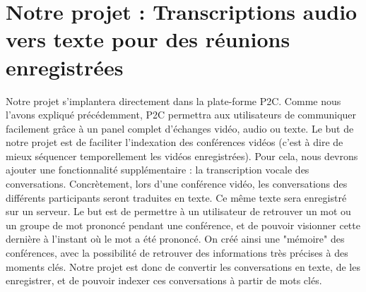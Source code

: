 	\section{Notre projet : Transcriptions audio vers texte pour des réunions enregistrées}
	Notre projet s'implantera directement dans la plate-forme P2C. Comme nous l'avons expliqué précédemment, P2C permettra aux utilisateurs de communiquer facilement grâce à un panel complet d'échanges vidéo, audio ou texte. Le but de notre projet est de faciliter l'indexation des conférences vidéos (c'est à dire de mieux séquencer temporellement les vidéos enregistrées). Pour cela, nous devrons ajouter une fonctionnalité supplémentaire : la transcription vocale des conversations. Concrètement, lors d'une conférence vidéo, les conversations des différents participants seront traduites en texte. Ce même texte sera enregistré sur un serveur. Le but est de permettre à un utilisateur de retrouver un mot ou un groupe de mot prononcé pendant une conférence, et de pouvoir visionner cette dernière à l'instant où le mot a été prononcé. On créé ainsi une "mémoire" des conférences, avec la possibilité de retrouver des informations très précises à des moments clés. 
	Notre projet est donc de convertir les conversations en texte, de les enregistrer, et de pouvoir indexer ces conversations à partir de mots clés.